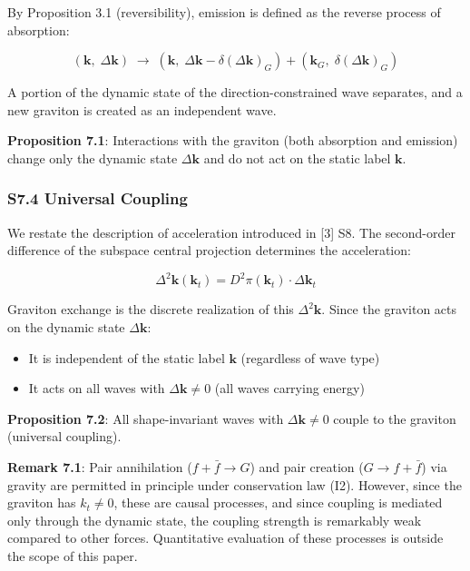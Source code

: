 \documentclass[
  a4paper,11pt]{article}
\providecommand{\tightlist}{%
  \setlength{\itemsep}{0pt}\setlength{\parskip}{0pt}}
\theoremstyle{definition}
\theoremstyle{remark}
\begin{document}
By Proposition 3.1 (reversibility), emission is defined as the reverse
process of absorption:

\[(\mathbf{k},\; \Delta\mathbf{k}) \;\longrightarrow\; (\mathbf{k},\; \Delta\mathbf{k} - \delta(\Delta\mathbf{k})_G) + (\mathbf{k}_G,\; \delta(\Delta\mathbf{k})_G)\]

A portion of the dynamic state of the direction-constrained wave
separates, and a new graviton is created as an independent wave.

\textbf{Proposition 7.1}: Interactions with the graviton (both
absorption and emission) change only the dynamic state
\(\Delta\mathbf{k}\) and do not act on the static label \(\mathbf{k}\).

\subsubsection{S7.4 Universal Coupling}\label{s7.4-universal-coupling}

We restate the description of acceleration introduced in {[}3{]} S8. The
second-order difference of the subspace central projection determines
the acceleration:

\[\Delta^2\mathbf{k}(\mathbf{k}_t) = D^2\pi(\mathbf{k}_t) \cdot \Delta\mathbf{k}_t\]

Graviton exchange is the discrete realization of this
\(\Delta^2\mathbf{k}\). Since the graviton acts on the dynamic state
\(\Delta\mathbf{k}\):

\begin{itemize}
\tightlist
\item
  It is independent of the static label \(\mathbf{k}\) (regardless of
  wave type)
\item
  It acts on all waves with \(\Delta\mathbf{k} \neq 0\) (all waves
  carrying energy)
\end{itemize}

\textbf{Proposition 7.2}: All shape-invariant waves with
\(\Delta\mathbf{k} \neq 0\) couple to the graviton (universal coupling).

\textbf{Remark 7.1}: Pair annihilation (\(f + \bar{f} \to G\)) and pair
creation (\(G \to f + \bar{f}\)) via gravity are permitted in principle
under conservation law (I2). However, since the graviton has
\(k_t \neq 0\), these are causal processes, and since coupling is
mediated only through the dynamic state, the coupling strength is
remarkably weak compared to other forces. Quantitative evaluation of
these processes is outside the scope of this paper.
\end{document}

